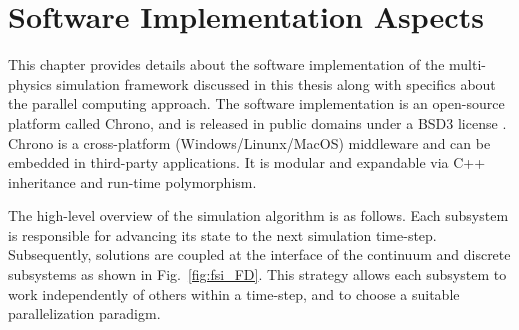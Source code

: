 \chapter{Software Implementation Aspects}
\label{chap:implementation}
This chapter provides details about the software implementation of the multi-physics simulation framework discussed in this thesis along with specifics about the parallel computing approach.  The software implementation is an open-source platform called Chrono, and is released in public domains under a BSD3 license \cite{projectChronoGithub,chronoOverview2016}. Chrono is a cross-platform (Windows/Linunx/MacOS) middleware and can be embedded in third-party applications. It is modular and expandable via C++ inheritance and run-time polymorphism.

The high-level overview of the simulation algorithm is as follows. Each subsystem is responsible for advancing its state to the next simulation time-step. Subsequently, solutions are coupled at the interface of the continuum and discrete subsystems as shown in Fig.~\ref{fig:fsi_FD}. This strategy allows each subsystem to work independently of others within a time-step, and to choose a suitable parallelization paradigm. 

